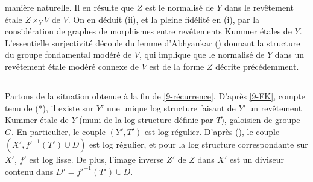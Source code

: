 \documentclass[10pt]{../fichiers-configuration-latex/smfart}
\begin{document}
manière naturelle. Il en résulte que $Z$ est le normalisé de $Y$ dans le revêtement étale $Z
\times_Y V$ de $V$. On en déduit (ii), et la pleine fidélité en (i), par la considération de graphes
de morphismes entre revêtements Kummer étales de $Y$. L'essentielle surjectivité découle du lemme
d'Abhyankar () donnant la structure du groupe fondamental modéré de $V$, qui
implique que le normalisé de $Y$ dans un revêtement étale modéré connexe de $V$ est de la forme $Z$
décrite précédemment.  \subsection{}\label{9-Kummer} Partons de la situation obtenue à la fin de
\ref{9-récurrence}. D'après \ref{9-FK}, compte tenu de (*), il existe sur $Y'$ une unique log
structure faisant de $Y'$ un revêtement Kummer étale de $Y$ (muni de la log structure définie par
$T$), galoisien de groupe $G$. En particulier, le couple $(Y',T')$ est log régulier. D'après
(), le couple $(X',f'^{-1}(T') \cup D)$ est log régulier, et
pour la log structure correspondante sur $X'$, $f'$ est log lisse. De plus, l'image inverse $Z'$ de
$Z$ dans $X'$ est un diviseur contenu dans $D' = f'^{-1}(T') \cup D$. 
\end{document}

